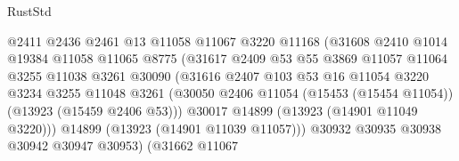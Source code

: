 \begin{lexlean}{RustStd}
\begin{coremodule}
                                    @2411
                                    @2436
                                    @2461
                                    @13
                                    @11058
                                    @11067
                                    @3220
                                    @11168
                                    (@31608
                                      @2410
                                      @1014
                                      @19384
                                      @11058
                                      @11065
                                      @8775
                                      (@31617
                                        @2409
                                        @53
                                        @55
                                        @3869
                                        @11057
                                        @11064
                                        @3255
                                        @11038
                                        @3261
                                        @30090
                                        (@31616
                                          @2407
                                          @103
                                          @53
                                          @16
                                          @11054
                                          @3220
                                          @3234
                                          @3255
                                          @11048
                                          @3261
                                          (@30050
                                            @2406
                                            @11054
                                            (@15453 (@15454 @11054))
                                            (@13923 (@15459 @2406 @53)))
                                          @30017
                                          @14899
                                          (@13923 (@14901 @11049 @3220)))
                                        @14899
                                        (@13923 (@14901 @11039 @11057)))
                                      @30932
                                      @30935
                                      @30938
                                      @30942
                                      @30947
                                      @30953)
                                    (@31662
                                      @11067

\end{coremodule}
\end{lexlean}
